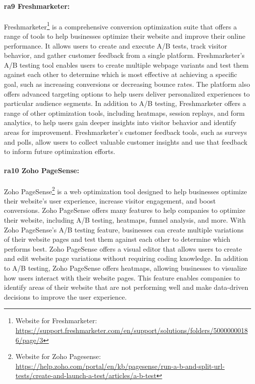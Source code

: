 \paragraph{\ac{ra}9 Freshmarketer:}
Freshmarketer\footnote{Website for Freshmarketer: \url{https://support.freshmarketer.com/en/support/solutions/folders/50000000186/page/3}} is a comprehensive conversion optimization suite that offers a range of tools to help businesses optimize their website and improve their online performance. 
It allows users to create and execute A/B tests, track visitor behavior, and gather customer feedback from a single platform. 
Freshmarketer's A/B testing tool enables users to create multiple webpage variants and test them against each other to determine which is most effective at achieving a specific goal, such as increasing conversions or decreasing bounce rates. 
The platform also offers advanced targeting options to help users deliver personalized experiences to particular audience segments.
In addition to A/B testing, Freshmarketer offers a range of other optimization tools, including heatmaps, session replays, and form analytics, to help users gain deeper insights into visitor behavior and identify areas for improvement. 
Freshmarketer's customer feedback tools, such as surveys and polls, allow users to collect valuable customer insights and use that feedback to inform future optimization efforts. 

\paragraph{\ac{ra}10 Zoho PageSense:}
Zoho PageSense\footnote{Website for Zoho Pagesense: \url{https://help.zoho.com/portal/en/kb/pagesense/run-a-b-and-split-url-tests/create-and-launch-a-test/articles/a-b-test}} is a web optimization tool designed to help businesses optimize their website's user experience, increase visitor engagement, and boost conversions. 
Zoho PageSense offers many features to help companies to optimize their website, including A/B testing, heatmaps, funnel analysis, and more.
With Zoho PageSense's A/B testing feature, businesses can create multiple variations of their website pages and test them against each other to determine which performs best. 
Zoho PageSense offers a visual editor that allows users to create and edit website page variations without requiring coding knowledge.
In addition to A/B testing, Zoho PageSense offers heatmaps, allowing businesses to visualize how users interact with their website pages. 
This feature enables companies to identify areas of their website that are not performing well and make data-driven decisions to improve the user experience.

